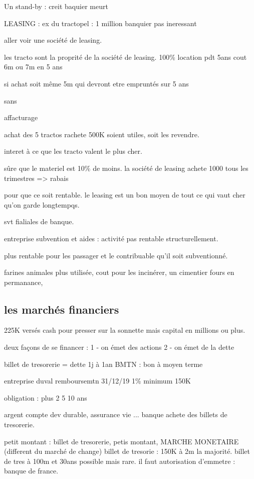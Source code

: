 \documentclass[a4paper,12pt]{article}
\begin{document}
Un stand-by : creit baquier meurt



LEASING : 
ex du tractopel : 1 million
banquier pas ineressant

aller voir une société de leasing.

les tracto sont la proprité de la société de leasing. 100\%
location pdt 5ans  cout 6m ou 7m en 5 ans

si achat soit même 5m qui devront etre empruntés sur 5 ans

sans 

affacturage


achat des 5 tractos rachete 500K soient utiles, soit les revendre.

interet à ce que les tracto valent le plus cher.

sûre que le materiel est 10\% de moins. la société de leasing achete 1000 tous les trimestres => rabais

pour que ce soit rentable. le leasing est un bon moyen de tout ce qui vaut cher qu'on garde longtempqs.

svt fialiales de banque.



entreprise subvention et aides : activité pas rentable structurellement.

plus rentable pour les passager et le contribuable qu'il soit subventionné.



farines animales plus utilisée, cout pour les incinérer, un cimentier fours en permanance,


\subsection{les marchés financiers} 

225K versés cash pour presser sur la sonnette mais capital en millions ou plus.

deux façons de se financer :
 1 - on émet des actions 
 2 - on émet de la dette
 
 billet de tresorerie = dette 1j à 1an
 BMTN : bon à moyen terme
 
 entreprise duval remboursemtn 31/12/19 1\% minimum 150K
 
 
 obligation : plus 2 5  10 ans
%

argent compte dev durable, assurance vie ... banque achete des billets de tresorerie.

petit montant : billet de tresorerie, petis montant,  MARCHE MONETAIRE  (different du marché de change)
billet de tresorie : 150K à 2m la majorité.
billet de tres à 100m et 30ans possible mais rare.
il faut autorisation d'emmetre : banque de france.
\end{document}

